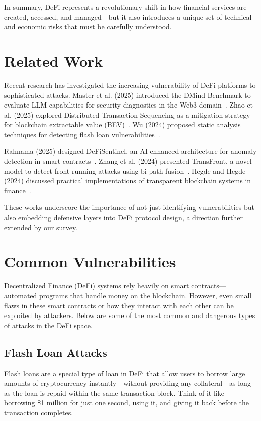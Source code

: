 \documentclass[conference]{IEEEtran}
\begin{document}
In summary, DeFi represents a revolutionary shift in how financial services are created, accessed, and managed—but it also introduces a unique set of technical and economic risks that must be carefully understood.



\section{Related Work}
Recent research has investigated the increasing vulnerability of DeFi platforms to sophisticated attacks. Master et al. (2025) introduced the DMind Benchmark to evaluate LLM capabilities for security diagnostics in the Web3 domain~\cite{master2025dmind}. Zhao et al. (2025) explored Distributed Transaction Sequencing as a mitigation strategy for blockchain extractable value (BEV)~\cite{zhao2025mitigating}. Wu (2024) proposed static analysis techniques for detecting flash loan vulnerabilities~\cite{wu2024static}.

Rahnama (2025) designed DeFiSentinel, an AI-enhanced architecture for anomaly detection in smart contracts~\cite{rahnama2025defisentinel}. Zhang et al. (2024) presented TransFront, a novel model to detect front-running attacks using bi-path fusion~\cite{zhang2024transfront}. Hegde and Hegde (2024) discussed practical implementations of transparent blockchain systems in finance~\cite{hegde2024efficient}.

These works underscore the importance of not just identifying vulnerabilities but also embedding defensive layers into DeFi protocol design, a direction further extended by our survey.

\section{Common Vulnerabilities}

Decentralized Finance (DeFi) systems rely heavily on smart contracts—automated programs that handle money on the blockchain. However, even small flaws in these smart contracts or how they interact with each other can be exploited by attackers. Below are some of the most common and dangerous types of attacks in the DeFi space.


\subsection{Flash Loan Attacks}

Flash loans are a special type of loan in DeFi that allow users to borrow large amounts of cryptocurrency instantly—without providing any collateral—as long as the loan is repaid within the same transaction block. Think of it like borrowing \$1 million for just one second, using it, and giving it back before the transaction completes.
\end{document}
